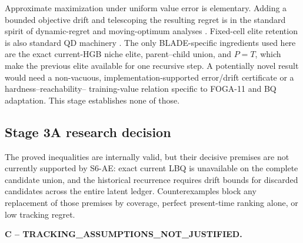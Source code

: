 Approximate maximization under uniform value error is elementary.  Adding a
bounded objective drift and telescoping the resulting regret is in the
standard spirit of dynamic-regret and moving-optimum analyses
\cite{Zinkevich2003,Dang2017,OlivetoZarges2015}.  Fixed-cell elite retention is
also standard QD machinery \cite{MouretClune2015,Pugh2016}.  The only
BLADE-specific ingredients used here are the exact current-HGB niche elite,
parent--child union, and $P=T$, which make the previous elite available for
one recursive step.  A potentially novel result would need a non-vacuous,
implementation-supported error/drift certificate or a hardness--reachability--
training-value relation specific to FOGA-11 and BQ adaptation.  This stage
establishes none of those.

\subsection{Stage 3A research decision}
The proved inequalities are internally valid, but their decisive premises
are not currently supported by S6-AE: exact current LBQ is unavailable on the
complete candidate union, and the historical recurrence requires drift bounds
for discarded candidates across the entire latent ledger.  Counterexamples
block any replacement of those premises by coverage, perfect present-time
ranking alone, or low tracking regret.

\textbf{C -- TRACKING\_ASSUMPTIONS\_NOT\_JUSTIFIED.}
